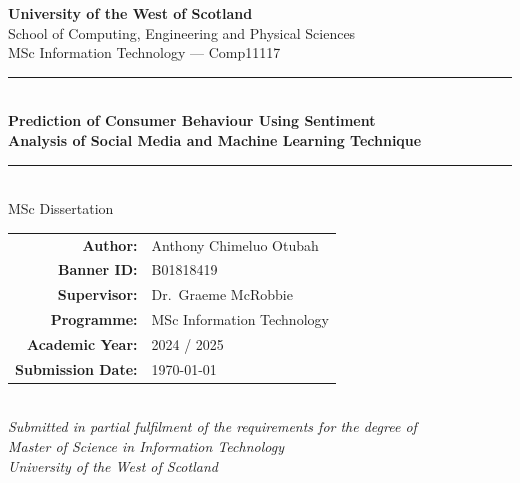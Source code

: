 \documentclass[12pt,a4paper,oneside,draft]{report}
\begin{document}

% 


\begin{titlepage}
\centering
\vspace*{8mm}
{\Large\textbf{University of the West of Scotland}}\\[3mm]
{\normalsize School of Computing, Engineering and Physical Sciences}\\[1mm]
{\normalsize MSc Information Technology --- Comp11117}\\[14mm]
\noindent\textcolor{uwsmid}{\rule{\linewidth}{2pt}}\\[4mm]
{\LARGE\bfseries\color{uwsblue}
  Prediction of Consumer Behaviour Using Sentiment\\[6pt]
  Analysis of Social Media and Machine Learning Technique}\\[4mm]
\noindent\textcolor{uwsmid}{\rule{\linewidth}{2pt}}\\[12mm]
{\Large MSc Dissertation}\\[18mm]
\begin{tabular}{@{}rl@{}}
  \textbf{Author:}          & Anthony Chimeluo Otubah \\[4pt]
  \textbf{Banner ID:}       & B01818419 \\[4pt]
  \textbf{Supervisor:}      & Dr.\ Graeme McRobbie \\[4pt]
  \textbf{Programme:}       & MSc Information Technology \\[4pt]
  \textbf{Academic Year:}   & 2024 / 2025 \\[4pt]
  \textbf{Submission Date:} & \today \\
\end{tabular}\\[20mm]
\vfill
{\small\itshape
  Submitted in partial fulfilment of the requirements for the degree of\\[2pt]
  Master of Science in Information Technology\\[6pt]
  University of the West of Scotland}
\end{titlepage}


\tableofcontents
\listoffigures
\listoftables
\printglossary[type=\acronymtype,title={List of Abbreviations},toctitle={List of Abbreviations}]
\cleardoublepage
{}
\end{document}
